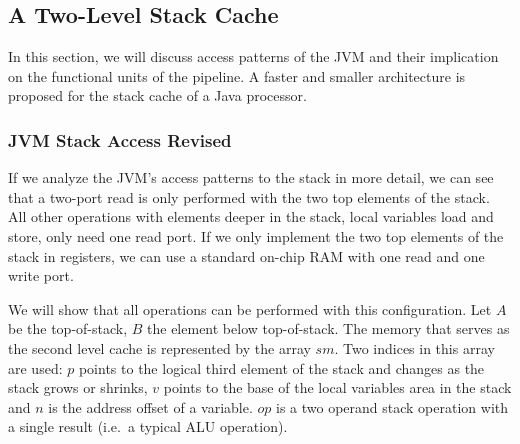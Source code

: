 \subsection{A Two-Level Stack Cache}

In this section, we will discuss access patterns of the JVM and
their implication on the functional units of the pipeline. A faster
and smaller architecture is proposed for the stack cache of a Java
processor.

\subsubsection{JVM Stack Access Revised}

If we analyze the JVM's access patterns to the stack in more detail,
we can see that a two-port read is only performed with the two top
elements of the stack. All other operations with elements deeper in
the stack, local variables load and store, only need one read port.
If we only implement the two top elements of the stack in registers,
we can use a standard on-chip RAM with one read and one write port.

We will show that all operations can be performed with this
configuration. Let $A$ be the top-of-stack, $B$ the element below
top-of-stack. The memory that serves as the second level cache is
represented by the array $sm$. Two indices in this array are used:
$p$ points to the logical third element of the stack and changes as
the stack grows or shrinks, $v$ points to the base of the local
variables area in the stack and $n$ is the address offset of a
variable. $op$ is a two operand stack operation with a single result
(i.e.\ a typical ALU operation).


